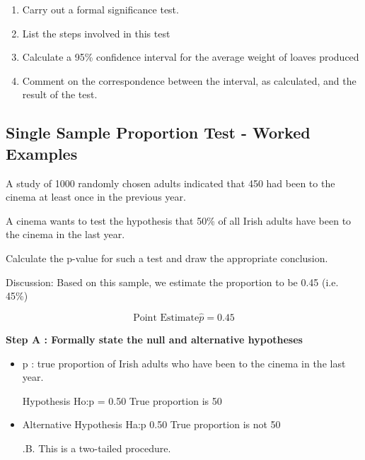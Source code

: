 \begin{enumerate}
\item  Carry out a formal significance test.
\item List the steps involved in this test 
\item Calculate a 95\% confidence interval for the average weight of loaves produced
\item Comment on the correspondence between the interval, as calculated, and the
result of the test.
\end{enumerate}



%
%
%
%
%




\subsection{ Single Sample Proportion Test - Worked Examples}

A study of 1000 randomly chosen adults indicated that 450 had been to the cinema at least once in the previous year.

A cinema wants to test the hypothesis that 50\% of all Irish adults have been to the cinema in the last year.

Calculate the p-value for such a test and draw the appropriate conclusion.

Discussion: Based on this sample, we estimate the proportion to be 0.45  (i.e. 45\%)

\[ \mbox{Point Estimate} \hat{p} = 0.45\]

\noindent \textbf{Step A : Formally state the null and alternative hypotheses}

\begin{itemize}
\item p : true proportion of Irish adults who have been to the cinema in the last year.

\itemNull Hypothesis               Ho:p = 0.50        True proportion is 50%

\item Alternative Hypothesis      Ha:p 0.50        True proportion is not 50%


\itemN.B. This is a two-tailed procedure.
\end{itemize}




